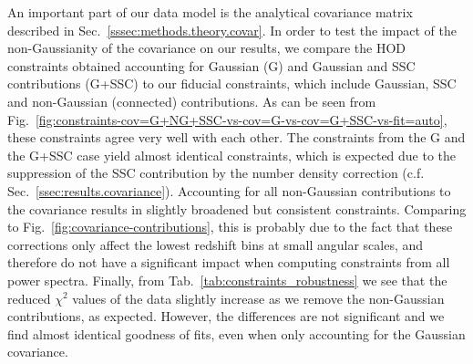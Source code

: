 \documentclass[a4paper,11pt]{article}
\begin{document}
      An important part of our data model is the analytical covariance matrix described in Sec.~\ref{sssec:methods.theory.covar}. In order to test the impact of the non-Gaussianity of the covariance on our results, we compare the HOD constraints obtained accounting for Gaussian (G) and Gaussian and SSC contributions (G+SSC) to our fiducial constraints, which include Gaussian, SSC and non-Gaussian (connected) contributions. As can be seen from Fig.~\ref{fig:constraints-cov=G+NG+SSC-vs-cov=G-vs-cov=G+SSC-vs-fit=auto}, these constraints agree very well with each other. The constraints from the G and the G+SSC case yield almost identical constraints, which is expected due to the suppression of the SSC contribution by the number density correction (c.f. Sec.~\ref{ssec:results.covariance}). Accounting for all non-Gaussian contributions to the covariance results in slightly broadened but consistent constraints. Comparing to Fig.~\ref{fig:covariance-contributions}, this is probably due to the fact that these corrections only affect the lowest redshift bins at small angular scales, and therefore do not have a significant impact when computing constraints from all power spectra. Finally, from Tab.~\ref{tab:constraints_robustness} we see that the reduced $\chi^{2}$ values of the data slightly increase as we remove the non-Gaussian contributions, as expected. However, the differences are not significant and we find almost identical goodness of fits, even when only accounting for the Gaussian covariance.
\end{document}
